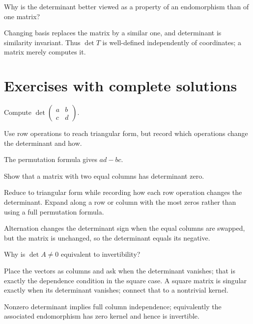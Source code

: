 \begin{problem}\label{prob:i08-problem-12}
Why is the determinant better viewed as a property of an endomorphism than of one matrix?
\end{problem}
\begin{solution}
Changing basis replaces the matrix by a similar one, and determinant is similarity invariant. Thus $\det T$ is well-defined independently of coordinates; a matrix merely computes it.
\end{solution}


\section{Exercises with complete solutions}

\begin{exercise}\label{exr:i08-01}
Compute $\det\begin{pmatrix}a&b\\c&d\end{pmatrix}$.
\end{exercise}
\begin{hint}
Use row operations to reach triangular form, but record which operations change the determinant and how.
\end{hint}
\begin{solution}
The permutation formula gives $ad-bc$.
\end{solution}

\begin{exercise}\label{exr:i08-02}
Show that a matrix with two equal columns has determinant zero.
\end{exercise}
\begin{hint}
Reduce to triangular form while recording how each row operation changes the determinant. Expand along a row or column with the most zeros rather than using a full permutation formula.
\end{hint}
\begin{solution}
Alternation changes the determinant sign when the equal columns are swapped, but the matrix is unchanged, so the determinant equals its negative.
\end{solution}

\begin{exercise}\label{exr:i08-03}
Why is $\det A\ne0$ equivalent to invertibility?
\end{exercise}
\begin{hint}
Place the vectors as columns and ask when the determinant vanishes; that is exactly the dependence condition in the square case. A square matrix is singular exactly when its determinant vanishes; connect that to a nontrivial kernel.
\end{hint}
\begin{solution}
Nonzero determinant implies full column independence; equivalently the associated endomorphism has zero kernel and hence is invertible.
\end{solution}

